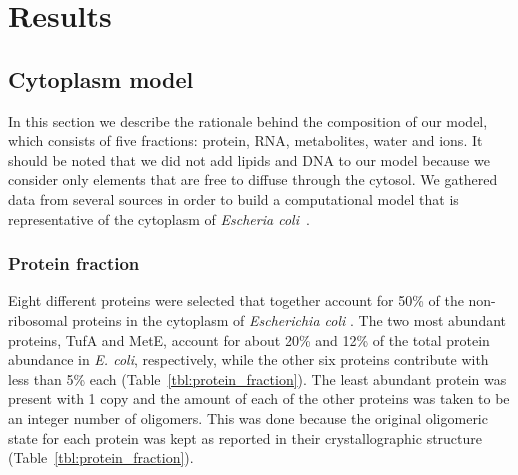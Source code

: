 \documentclass[journal=jcisd8,manuscript=article]{achemso}
\begin{document}
\section*{Results}

\subsection{Cytoplasm model}
In this section we describe the rationale behind the composition of
our model, which consists of five fractions: protein, RNA, metabolites, water
and ions. It should be noted that we did not add lipids and DNA to our
model because we consider only elements that are free to diffuse
through the cytosol. We gathered data from several sources in order to
build a computational model that is representative of the cytoplasm of
{\em Escheria coli}~\cite{Dong1996,Bennett2009,Link1997,Mcguffee2010}.

\subsubsection{Protein fraction}
Eight different proteins were selected that together account for 50\%
of the non-ribosomal proteins in the cytoplasm of {\em Escherichia
  coli} \cite{Link1997}. The two most abundant proteins, TufA and
MetE, account for about 20\% and 12\% of the total protein abundance
in {\em E. coli}, respectively, while the other six proteins
contribute with less than 5\% each (Table~\ref{tbl:protein_fraction}).
The least abundant protein was present with 1 copy and the amount of
each of the other proteins was taken to be an integer number of
oligomers. This was done because the original oligomeric state for
each protein was kept as reported in their crystallographic structure
(Table~\ref{tbl:protein_fraction}).
\end{document}
